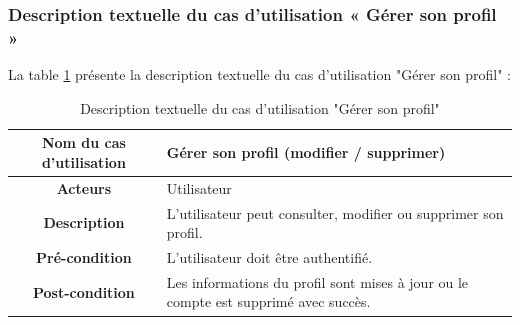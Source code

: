 \subsubsection{Description textuelle du cas d’utilisation « Gérer son profil »}
La table \ref{tab:gerer_profil} présente la description textuelle du cas d’utilisation "Gérer son profil" :
\begin{longtable}{|c|p{11cm}|}
\caption{Description textuelle du cas d'utilisation "Gérer son profil"}
\label{tab:gerer_profil} \\
\hline
\cellcolor{coloranihub}\textbf{Nom du cas d'utilisation } & Gérer son profil (modifier / supprimer) \\
\hline
\cellcolor{coloranihub}\textbf{Acteurs} & Utilisateur \\
\hline
\cellcolor{coloranihub}\textbf{Description } & L’utilisateur peut consulter, modifier ou supprimer son profil. \\
\hline
\cellcolor{coloranihub}\textbf{Pré-condition } & L’utilisateur doit être authentifié. \\
\hline
\cellcolor{coloranihub}\textbf{Post-condition } & Les informations du profil sont mises à jour ou le compte est supprimé avec succès. \\
\hline


\end{longtable}
